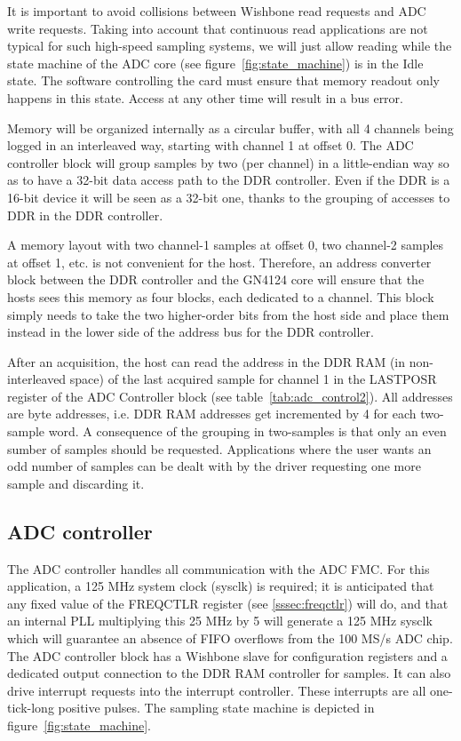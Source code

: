 \documentclass[a4paper]{article}
\begin{document}
It is important to avoid collisions between Wishbone read requests and ADC write requests. Taking into account that continuous read applications are not typical for such high-speed sampling systems, we will just allow reading while the state machine of the ADC core (see figure~\ref{fig:state_machine}) is in the Idle state. The software controlling the card must ensure that memory readout only happens in this state. Access at any other time will result in a bus error. 

Memory will be organized internally as a circular buffer, with all 4 channels being logged in an interleaved way, starting with channel 1 at offset 0. The ADC controller block will group samples by two (per channel) in a little-endian way so as to have a 32-bit data access path to the DDR controller. Even if the DDR is a 16-bit device it will be seen as a 32-bit one, thanks to the grouping of accesses to DDR in the DDR controller.

A memory layout with two channel-1 samples at offset 0, two channel-2 samples at offset 1, etc. is not convenient for the host. Therefore, an address converter block between the DDR controller and the GN4124 core will ensure that the hosts sees this memory as four blocks, each dedicated to a channel. This block simply needs to take the two higher-order bits from the host side and place them instead in the lower side of the address bus for the DDR controller.
 
After an acquisition, the host can read the address in the DDR RAM (in non-interleaved space) of the last acquired sample for channel 1 in the LASTPOSR register of the ADC Controller block (see table~\ref{tab:adc_control2}). All addresses are byte addresses, i.e. DDR RAM addresses get incremented by 4 for each two-sample word. A consequence of the grouping in two-samples is that only an even sumber of samples should be requested. Applications where the user wants an odd number of samples can be dealt with by the driver requesting one more sample and discarding it. 

\subsection{ADC controller}
The ADC controller handles all communication with the ADC FMC. For this application, a 125 MHz system clock (sysclk) is required; it is anticipated that any fixed value of the FREQCTLR register (see \ref{sssec:freqctlr}) will do, and that an internal PLL multiplying this 25 MHz by 5 will generate a 125 MHz sysclk which will guarantee an absence of FIFO overflows from the 100 MS/s ADC chip. The ADC controller block has a Wishbone slave for configuration registers and a dedicated output connection to the DDR RAM controller for samples. It can also drive interrupt requests into the interrupt controller. These interrupts are all one-tick-long positive pulses. The sampling state machine is depicted in figure~\ref{fig:state_machine}. 
\end{document}
